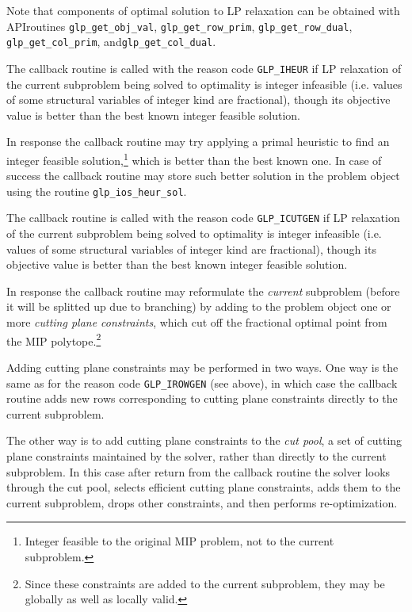 Note that components of optimal solution to LP relaxation can be
obtained with API\linebreak routines \verb|glp_get_obj_val|,
\verb|glp_get_row_prim|, \verb|glp_get_row_dual|,
\verb|glp_get_col_prim|, and\linebreak \verb|glp_get_col_dual|.


The callback routine is called with the reason code \verb|GLP_IHEUR|
if LP relaxation of the current subproblem being solved to optimality
is integer infeasible (i.e. values of some structural variables of
integer kind are fractional), though its objective value is better than
the best known integer feasible solution.

In response the callback routine may try applying a primal heuristic
to find an integer feasible solution,\footnote{Integer feasible to the
original MIP problem, not to the current subproblem.} which is better
than the best known one. In case of success the callback routine may
store such better solution in the problem object using the routine
\verb|glp_ios_heur_sol|.


The callback routine is called with the reason code \verb|GLP_ICUTGEN|
if LP relaxation of the current subproblem being solved to optimality
is integer infeasible (i.e. values of some structural variables of
integer kind are fractional), though its objective value is better than
the best known integer feasible solution.

In response the callback routine may reformulate the {\it current}
subproblem (before it will be splitted up due to branching) by adding
to the problem object one or more {\it cutting plane constraints},
which cut off the fractional optimal point from the MIP
polytope.\footnote{Since these constraints are added to the current
subproblem, they may be globally as well as locally valid.}

Adding cutting plane constraints may be performed in two ways.
One way is the same as for the reason code \verb|GLP_IROWGEN| (see
above), in which case the callback routine adds new rows corresponding
to cutting plane constraints directly to the current subproblem.

The other way is to add cutting plane constraints to the
{\it cut pool}, a set of cutting plane constraints maintained by the
solver, rather than directly to the current subproblem. In this case
after return from the callback routine the solver looks through the
cut pool, selects efficient cutting plane constraints, adds them to the
current subproblem, drops other constraints, and then performs
re-optimization.

